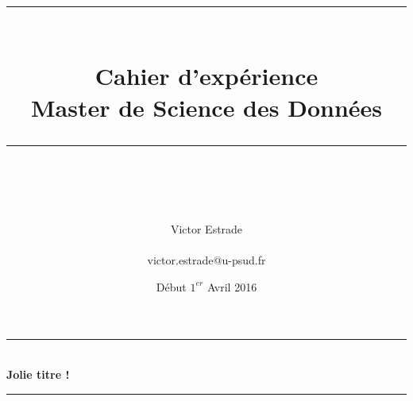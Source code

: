 \documentclass[hyperref,openany,10pt]{labbook} %
\newcommand{\HRule}{\rule{\linewidth}{0.5mm}} %
\begin{document}

\frontmatter %
\title{
\begin{center}
\HRule \\[0.4cm]
{\Huge \bfseries Cahier d'expérience \\[0.5cm] \Large Master de Science des Données}\\[0.4cm] %
\HRule \\[1.5cm]
\end{center}
}
\author{\Huge Victor Estrade \\ \\ \LARGE victor.estrade@u-psud.fr \\[2cm]} %
\date{Début $1^{er}$ Avril 2016} %
\maketitle

\tableofcontents

\mainmatter %







\labday{} %

\begin{center}
\HRule \\[0.4cm]
{\huge \textbf{Jolie titre !}}\\[0.4cm] %
\HRule \\[1.5cm]
\end{center}

\end{document}
